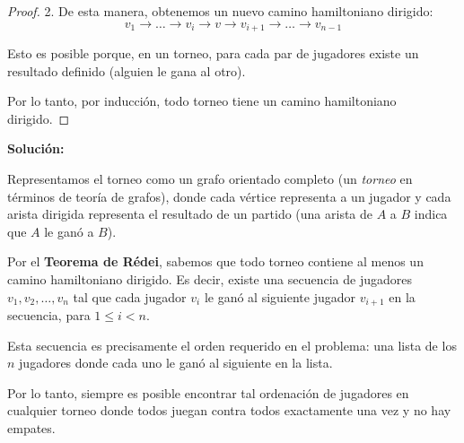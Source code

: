 \documentclass[11pt]{scrartcl}
\begin{document}
\begin{problem}
\begin{hint}
\begin{solu}
\begin{proof}
2. De esta manera, obtenemos un nuevo camino hamiltoniano dirigido:
   $$
   v_1 \rightarrow \dots \rightarrow v_i \rightarrow v \rightarrow v_{i+1} \rightarrow \dots \rightarrow v_{n-1}
   $$

Esto es posible porque, en un torneo, para cada par de jugadores existe un resultado definido (alguien le gana al otro).

Por lo tanto, por inducción, todo torneo tiene un camino hamiltoniano dirigido.

\end{proof}

\textbf{Solución:}

Representamos el torneo como un grafo orientado completo (un \textit{torneo} en términos de teoría de grafos), donde cada vértice representa a un jugador y cada arista dirigida representa el resultado de un partido (una arista de $A$ a $B$ indica que $A$ le ganó a $B$).

Por el \textbf{Teorema de Rédei}, sabemos que todo torneo contiene al menos un camino hamiltoniano dirigido. Es decir, existe una secuencia de jugadores $v_1, v_2, \dots, v_n$ tal que cada jugador $v_i$ le ganó al siguiente jugador $v_{i+1}$ en la secuencia, para $1 \leq i < n$.

Esta secuencia es precisamente el orden requerido en el problema: una lista de los $n$ jugadores donde cada uno le ganó al siguiente en la lista.

Por lo tanto, siempre es posible encontrar tal ordenación de jugadores en cualquier torneo donde todos juegan contra todos exactamente una vez y no hay empates.
\end{solu}
\end{hint}
\end{problem}
\end{document}

